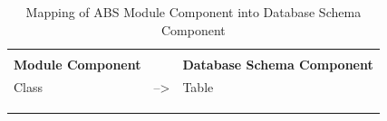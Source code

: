\documentclass[conference]{IEEEtran}
\begin{document}
\begin{table}[]
	\centering
	\caption{Mapping of ABS Module Component into Database Schema Component}
	\label{table3}
	\begin{tabular}{|l|l|l|}
		\hline
		\multicolumn{1}{|c|}{\cellcolor[HTML]{C0C0C0}}                                                   & \multicolumn{1}{c|}{\cellcolor[HTML]{C0C0C0}}                                                                               & \multicolumn{1}{c|}{\cellcolor[HTML]{C0C0C0}}                                                                                                      \\
		\multicolumn{1}{|c|}{\multirow{-2}{*}{\cellcolor[HTML]{C0C0C0}\textbf{Module Component}}}        & \multicolumn{1}{c|}{\multirow{-2}{*}{\cellcolor[HTML]{C0C0C0}\textbf{}}}                                                    & \multicolumn{1}{c|}{\multirow{-2}{*}{\cellcolor[HTML]{C0C0C0}\textbf{Database Schema Component}}}                                                  \\ \hline
		Class                                                                                            & --\textgreater                                                                                                              & Table                                                                                                                                              \\ \hline
		&                                                                                                                             &                                                                                                                                                    \\
		&                                                                                                                             &                                                                                                                                                    \\
		&                                                                                                                             &                                                                                                                                                    \\

\end{tabular}
\end{table}
\end{document}
